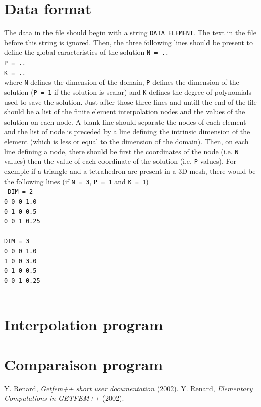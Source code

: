 \documentclass[11pt,a4paper]{article}
\begin{document}
\newpage
\tableofcontents
\newpage

\section{Data format}
The data in the file should begin with a string {\tt DATA ELEMENT}. The text in the file before this string is ignored. Then, the three following lines should be present to define the global caracteristics of the solution
{\tt N = ..\\
  P = ..\\
  K = ..\\
}
where {\tt N} defines the dimension of the domain, {\tt P} defines the dimension of the solution ({\tt P = 1} if the solution is scalar) and {\tt K} defines the degree of polynomials used to save the solution. Just after those three lines and untill the end of the file should be a list of the finite element interpolation nodes and the values of the solution on each node. A blank line should separate the nodes of each element and the list of node is preceded by a line defining the intrinsic dimension of the element (which is less or equal to the dimension of the domain). Then, on each line defining a node, there should be first the coordinates of the node (i.e. {\tt N} values) then the value of each coordinate of the solution (i.e. {\tt P} values). For exemple if a triangle and a tetrahedron are present in a 3D mesh, there would be the following lines (if {\tt N = 3}, {\tt P = 1} and {\tt K = 1})\\[0.5cm]
{\tt 
  DIM = 2 \\
  0 0 0 1.0 \\
  0 1 0 0.5 \\
  0 0 1 0.25 \\
  \\
  DIM = 3 \\
  0 0 0 1.0 \\
  1 0 0 3.0 \\
  0 1 0 0.5 \\
  0 0 1 0.25 \\
  \\
}

\section{Interpolation program}
\section{Comparaison program}



\begin{thebibliography}{99}
% 
% 
% 
  Y. {\sc Renard},
  {\it Getfem++ short user documentation} (2002).
  Y. {\sc Renard},
  {\it Elementary Computations in GETFEM++} (2002).
\end{thebibliography}
\end{document}
